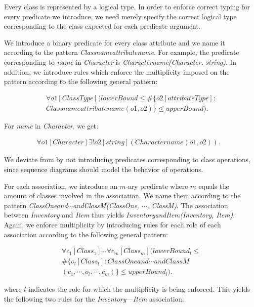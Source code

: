 \documentclass[conference]{IEEEtran}
\begin{document}
Every class is represented by a logical type. In order to enforce correct typing for every predicate we introduce, we need merely specify the correct logical type corresponding to the class expected for each predicate argument.

We introduce a binary predicate for every class attribute and we name it according to the pattern \textit{Classnameattributename}. For example, the predicate corresponding to \textit{name} in \textit{Character} is \textit{Charactername(Character, string)}. In addition, we introduce rules which enforce the multiplicity imposed on the pattern according to the following general pattern:

\begin{align*}
	&\forall{o1}[ClassType](lowerBound \leq \#\{o2[attributeType] : \\ &Classnameattributename(o1, o2)\} \leq upperBound).
\end{align*}

For \textit{name} in \textit{Character}, we get:

\begin{align*}
	\forall{o1}[Character]\exists!{o2}[string](Charactername(o1, o2)).
\end{align*}

We deviate from \cite{BerardiDaniela2005RoUc} by not introducing predicates corresponding to class operations, since sequence diagrams should model the behavior of operations.

For each association, we introduce an $m$-ary predicate where $m$ equals the amount of classes involved in the association. We name them according to the pattern \textit{ClassOneand$\cdots$andClassM(ClassOne, $\cdots$, ClassM)}. The association between \textit{Inventory} and \textit{Item} thus yields \textit{InventoryandItem(Inventory, Item)}. Again, we enforce multiplicity by introducing rules for each role of each association according to the following general pattern:

\begin{align*}
	&\forall{c_1}[Class_1]\cdots{}\forall{c_m}[Class_m](lowerBound_l \leq \\ &\#\{o_l[Class_l] : ClassOneand\cdots{}andClassM\\&(c_1, \cdots, o_l, \cdots, c_m)\} \leq upperBound_l).
\end{align*}

where $l$ indicates the role for which the multiplicity is being enforced. This yields the following two rules for the \textit{Inventory}---\textit{Item} association:
\end{document}
